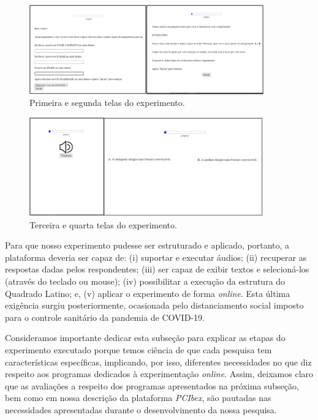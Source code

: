 \documentclass{textolivre}
\begin{document}
\begin{figure}[htbp]
 \centering
 \includegraphics[width=0.9\textwidth]{fig-001.png}
 \caption{Primeira e segunda telas do experimento.}
 \label{fig1}
\end{figure}

\begin{figure}[htbp]
 \centering
 \includegraphics[width=0.9\textwidth]{fig-002.png} 
 \caption{Terceira e quarta telas do experimento\protect\footnotemark.}
 \label{fig2}
\end{figure}


Para que nosso experimento pudesse ser estruturado e aplicado, portanto, a plataforma deveria ser capaz de: (i) suportar e executar áudios; (ii) recuperar as respostas dadas pelos respondentes; (iii) ser capaz de exibir textos e selecioná-los (através do teclado ou mouse); (iv) possibilitar a execução da estrutura do Quadrado Latino; e, (v) aplicar o experimento de forma \textit{online}. Esta última exigência surgiu posteriormente, ocasionada pelo distanciamento social imposto para o controle sanitário da pandemia de COVID-19.

Consideramos importante dedicar esta subseção para explicar as etapas do experimento executado porque temos ciência de que cada pesquisa tem características específicas, implicando, por isso, diferentes necessidades no que diz respeito aos programas dedicados à experimentação \textit{online}. Assim, deixamos claro que as avaliações a respeito dos programas apresentados na próxima subseção, bem como em nossa descrição da plataforma \emph{PCIbex}, são pautadas nas necessidades apresentadas durante o desenvolvimento da nossa pesquisa.
\end{document}
